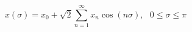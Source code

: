 \begin{equation}\label{eq110.1:ps}
x(\sigma)=x_{0}+\sqrt{2}\sum^{\infty}_{n=1}x_{n}\cos(n\sigma),~~~0\leq \sigma \leq\pi
\end{equation}


